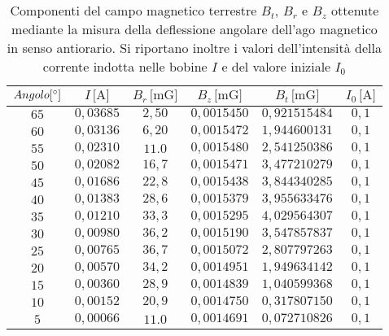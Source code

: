 \documentclass[]{article}
\begin{document}
\begin{table}
    \centering

\begin{tabular}{||c|c|c|c|c|c||}
    \hline
    $Angolo [\text{\degree}]$ & $I\, \text{[A]} $ & $B_r\, \text{[mG]} $ & $B_z\, \text{[mG]} $ & $B_t\, \text{[mG]} $ & $I_0\, \text{[A]} $\\
    \hline\hline



    $65$ & $0,03685$ & $2,50$ & $0,0015450$ & $0,921515484$ & $0,1$ \\\hline
    $60$ & $0,03136$ & $6,20$ & $0,0015472$ & $1,944600131$ & $0,1$ \\\hline
    $55$ & $0,02310$ & $11.0$ & $0,0015480$ & $2,541250386$ & $0,1$ \\\hline
    $50$ & $0,02082$ & $16,7$ & $0,0015471$ & $3,477210279$ & $0,1$ \\\hline
    $45$ & $0,01686$ & $22,8$ & $0,0015438$ & $3,844340285$ & $0,1$ \\\hline
    $40$ & $0,01383$ & $28,6$ & $0,0015379$ & $3,955633476$ & $0,1$ \\\hline
    $35$ & $0,01210$ & $33,3$ & $0,0015295$ & $4,029564307$ & $0,1$ \\\hline
    $30$ & $0,00980$ & $36,2$ & $0,0015190$ & $3,547857837$ & $0,1$ \\\hline
    $25$ & $0,00765$ & $36,7$ & $0,0015072$ & $2,807797263$ & $0,1$ \\\hline
    $20$ & $0,00570$ & $34,2$ & $0,0014951$ & $1,949634142$ & $0,1$ \\\hline
    $15$ & $0,00360$ & $28,9$ & $0,0014839$ & $1,040599368$ & $0,1$ \\\hline
    $10$ & $0,00152$ & $20,9$ & $0,0014750$ & $0,317807150$ & $0,1$ \\\hline
    $5 $ & $0,00066$ & $11.0$ & $0,0014691$ & $0,072710826$ & $0,1$ \\\hline

\end{tabular}
\caption{Componenti del campo magnetico terrestre $B_t$, $B_r$ e $B_z$ ottenute mediante la misura della deflessione angolare dell'ago magnetico in senso antiorario. Si riportano inoltre i valori dell'intensità della corrente indotta nelle bobine $I$ e del valore iniziale $I_0$}
\label{campomagneticoterrestre_sensoantiorario}
\end{table}
\end{document}
